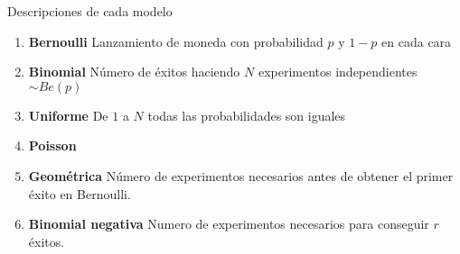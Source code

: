 \documentclass[leqno]{article}
\begin{document}
Descripciones de cada modelo
\begin{enumerate}[topsep=-6pt, itemsep=0pt]
  \item \textbf{Bernoulli} Lanzamiento de moneda con probabilidad $p$ y  $1-p$ en cada cara
  \item  \textbf{Binomial} Número de éxitos haciendo $N$ experimentos independientes  $\sim Be(p)$
  \item  \textbf{Uniforme} De  $1$ a  $N$ todas las probabilidades son iguales
  \item  \textbf{Poisson} 
  \item \textbf{Geométrica} Número de experimentos necesarios antes de obtener el primer éxito en Bernoulli. 
  \item \textbf{Binomial negativa} Numero de experimentos necesarios para conseguir $r$ éxitos.
\end{enumerate}
\end{document}
